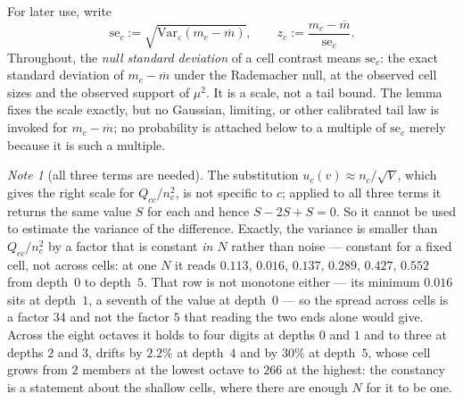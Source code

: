\documentclass[11pt,a4paper]{article}
\theoremstyle{plain}
\theoremstyle{definition}
\theoremstyle{remark}
\newtheorem{note}[theorem]{Note}
\begin{document}
For later use, write
\[
  \mathrm{se}_c:=\sqrt{\mathrm{Var}_\varepsilon(m_c-\overline m)},
  \qquad
  z_c:=\frac{m_c-\overline m}{\mathrm{se}_c}.
\]
Throughout, the \emph{null standard deviation} of a cell contrast means
$\mathrm{se}_c$: the exact standard deviation of $m_c-\overline m$
under the Rademacher null, at the observed cell sizes and the observed
support of $\mu^2$. It is a scale, not a tail bound. The lemma fixes the
scale exactly, but no Gaussian, limiting, or other calibrated tail law
is invoked for $m_c-\overline m$; no probability is attached below to
a multiple of $\mathrm{se}_c$ merely because it is such a multiple.

\begin{note}[all three terms are needed]\label{note:threeterms}
The substitution $u_c(v)\approx n_c/\sqrt V$, which gives the right
scale for $Q_{cc}/n_c^2$, is not specific to $c$; applied to all three
terms it returns the same value $S$ for each and hence $S-2S+S=0$. So
it cannot be used to estimate the variance of the difference. Exactly,
the variance is smaller than $Q_{cc}/n_c^2$ by a factor that is
constant \emph{in $N$} rather than noise --- constant for a fixed
cell, not across cells: at one $N$ it reads $0.113$, $0.016$, $0.137$,
$0.289$, $0.427$, $0.552$ from depth~$0$ to depth~$5$. That row is not
monotone either --- its minimum $0.016$ sits at depth~$1$, a seventh of
the value at depth~$0$ --- so the spread across cells is a factor $34$
and not the factor $5$ that reading the two ends alone would give.
Across the eight octaves it holds to four
digits at depths $0$ and $1$ and to three at depths $2$ and $3$,
drifts by $2.2\%$ at depth~$4$ and by
$30\%$ at depth~$5$, whose cell grows from $2$ members at the lowest
octave to $266$ at the highest: the
constancy is a statement about the shallow cells, where there are
enough $N$ for it to be one.
\end{note}
\end{document}
